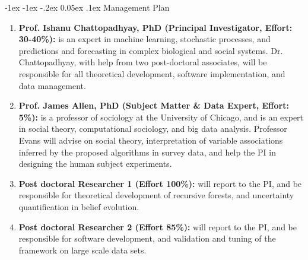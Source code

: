 \documentclass[onecolumn, compsoc,11pt]{IEEEtran}
\makeatletter
\renewcommand\section{\@startsection {section}{1}{\z@}%
                                   {-1ex \@plus -1ex \@minus -.2ex}%
                                   {0.05ex \@plus.1ex}%
                                   {\large\bfseries\scshape}}
\newcommand{\tball}[1][CadetBlue4]{${\color{#1}\Large\boldsymbol{\blacksquare}}$}
\makeatother
\begin{document}
\section{Management Plan}
\begin{enumerate}
[label=\tball, leftmargin=0pt,
labelindent=0em, topsep=0.1em, labelsep=*, itemsep=.25em,itemindent=2em]\color{black} \sffamily\fontsize{11}{12}\selectfont
\item \textbf{Prof. Ishanu Chattopadhyay, PhD (Principal Investigator, Effort: 30-40\%):} is an expert in machine learning, stochastic processes, and predictions and forecasting in complex biological and social systems. Dr. Chattopadhyay, with help from two post-doctoral associates,  will be responsible for all theoretical development, software implementation, and data management. 
\item \textbf{Prof. James Allen, PhD (Subject Matter \& Data Expert, Effort: 5\%):} is a professor of  sociology at the University of Chicago, and is an expert in social theory, computational sociology, and big data analysis. Professor Evans will advise on social theory, interpretation of variable associations inferred by the proposed algorithms in survey data,  and help the PI in designing the human subject experiments.
  \item \textbf{Post doctoral Researcher 1 (Effort 100\%):} will report to the PI, and be responsible for theoretical development  of recursive forests, and uncertainty quantification in belief evolution.
  \item \textbf{Post doctoral Researcher 2 (Effort 85\%):} will report to the PI, and be responsible for software development, and validation and tuning of the framework on large scale data sets.
\end{enumerate}
\end{document}
